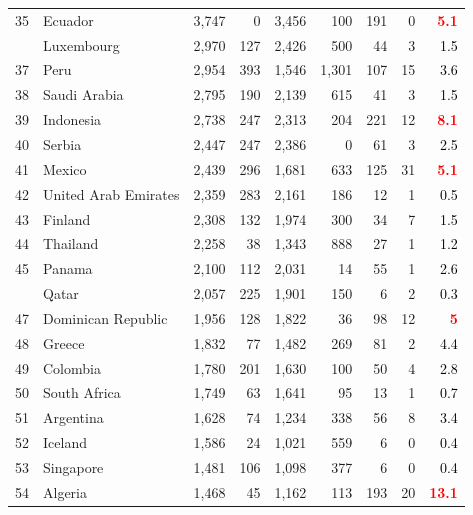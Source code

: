 \documentclass[12pt, a4paper,oneside]{book}
\theoremstyle{definition}
\begin{document}
\begin{longtable}{llrrrrrrr}
	\rowcolor{gray!6}  35 & Ecuador & 3,747 & 0 & 3,456 & 100 & 191 & 0 & \textcolor{red}{\textbf{5.1}}\\
	\addlinespace
	36 & Luxembourg & 2,970 & 127 & 2,426 & 500 & 44 & 3 & \textcolor{black}{1.5}\\
	\rowcolor{gray!6}  37 & Peru & 2,954 & 393 & 1,546 & 1,301 & 107 & 15 & \textcolor{black}{3.6}\\
	38 & Saudi Arabia & 2,795 & 190 & 2,139 & 615 & 41 & 3 & \textcolor{black}{1.5}\\
	\rowcolor{gray!6}  39 & Indonesia & 2,738 & 247 & 2,313 & 204 & 221 & 12 & \textcolor{red}{\textbf{8.1}}\\
	40 & Serbia & 2,447 & 247 & 2,386 & 0 & 61 & 3 & \textcolor{black}{2.5}\\
	\addlinespace
	\rowcolor{gray!6}  41 & Mexico & 2,439 & 296 & 1,681 & 633 & 125 & 31 & \textcolor{red}{\textbf{5.1}}\\
	42 & United Arab Emirates & 2,359 & 283 & 2,161 & 186 & 12 & 1 & \textcolor{black}{0.5}\\
	\rowcolor{gray!6}  43 & Finland & 2,308 & 132 & 1,974 & 300 & 34 & 7 & \textcolor{black}{1.5}\\
	44 & Thailand & 2,258 & 38 & 1,343 & 888 & 27 & 1 & \textcolor{black}{1.2}\\
	\rowcolor{gray!6}  45 & Panama & 2,100 & 112 & 2,031 & 14 & 55 & 1 & \textcolor{black}{2.6}\\
	\addlinespace
	46 & Qatar & 2,057 & 225 & 1,901 & 150 & 6 & 2 & \textcolor{black}{0.3}\\
	\rowcolor{gray!6}  47 & Dominican Republic & 1,956 & 128 & 1,822 & 36 & 98 & 12 & \textcolor{red}{\textbf{5}}\\
	48 & Greece & 1,832 & 77 & 1,482 & 269 & 81 & 2 & \textcolor{black}{4.4}\\
	\rowcolor{gray!6}  49 & Colombia & 1,780 & 201 & 1,630 & 100 & 50 & 4 & \textcolor{black}{2.8}\\
	50 & South Africa & 1,749 & 63 & 1,641 & 95 & 13 & 1 & \textcolor{black}{0.7}\\
	\addlinespace
	\rowcolor{gray!6}  51 & Argentina & 1,628 & 74 & 1,234 & 338 & 56 & 8 & \textcolor{black}{3.4}\\
	52 & Iceland & 1,586 & 24 & 1,021 & 559 & 6 & 0 & \textcolor{black}{0.4}\\
	\rowcolor{gray!6}  53 & Singapore & 1,481 & 106 & 1,098 & 377 & 6 & 0 & \textcolor{black}{0.4}\\
	54 & Algeria & 1,468 & 45 & 1,162 & 113 & 193 & 20 & \textcolor{red}{\textbf{13.1}}\\

\end{longtable}
\end{document}
